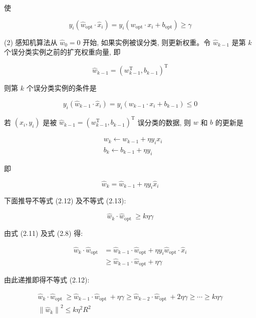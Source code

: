 \documentclass[10pt]{article}
\begin{document}
使

$$
y_{i}\left(\hat{w}_{\mathrm{opt}} \cdot \hat{x}_{i}\right)=y_{i}\left(w_{\mathrm{opt}} \cdot x_{i}+b_{\mathrm{opt}}\right) \geqslant \gamma
$$

(2) 感知机算法从 $\hat{w}_{0}=0$ 开始, 如果实例被误分类, 则更新权重。令 $\hat{w}_{k-1}$ 是第 $k$ 个误分类实例之前的扩充权重向量, 即

$$
\hat{w}_{k-1}=\left(w_{k-1}^{\mathrm{T}}, b_{k-1}\right)^{\mathrm{T}}
$$

则第 $k$ 个误分类实例的条件是


\begin{equation*}
y_{i}\left(\hat{w}_{k-1} \cdot \hat{x}_{i}\right)=y_{i}\left(w_{k-1} \cdot x_{i}+b_{k-1}\right) \leqslant 0 \tag{2.10}
\end{equation*}


若 $\left(x_{i}, y_{i}\right)$ 是被 $\hat{w}_{k-1}=\left(w_{k-1}^{\mathrm{T}}, b_{k-1}\right)^{\mathrm{T}}$ 误分类的数据, 则 $w$ 和 $b$ 的更新是

$$
\begin{aligned}
& w_{k} \leftarrow w_{k-1}+\eta y_{i} x_{i} \\
& b_{k} \leftarrow b_{k-1}+\eta y_{i}
\end{aligned}
$$

即


\begin{equation*}
\hat{w}_{k}=\hat{w}_{k-1}+\eta y_{i} \hat{x}_{i} \tag{2.11}
\end{equation*}


下面推导不等式 (2.12) 及不等式 (2.13):


\begin{equation*}
\hat{w}_{k} \cdot \hat{w}_{\text {opt }} \geqslant k \eta \gamma \tag{2.12}
\end{equation*}


由式 (2.11) 及式 (2.8) 得:

$$
\begin{aligned}
\hat{w}_{k} \cdot \hat{w}_{\mathrm{opt}} & =\hat{w}_{k-1} \cdot \hat{w}_{\mathrm{opt}}+\eta y_{i} \hat{w}_{\mathrm{opt}} \cdot \hat{x}_{i} \\
& \geqslant \hat{w}_{k-1} \cdot \hat{w}_{\mathrm{opt}}+\eta \gamma
\end{aligned}
$$

由此递推即得不等式 (2.12):


\begin{gather*}
\hat{w}_{k} \cdot \hat{w}_{\text {opt }} \geqslant \hat{w}_{k-1} \cdot \hat{w}_{\text {opt }}+\eta \gamma \geqslant \hat{w}_{k-2} \cdot \hat{w}_{\text {opt }}+2 \eta \gamma \geqslant \cdots \geqslant k \eta \gamma \\
\left\|\hat{w}_{k}\right\|^{2} \leqslant k \eta^{2} R^{2} \tag{2.13}
\end{gather*}
\end{document}
